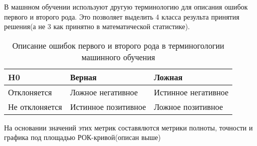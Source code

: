 В машнном обучении используют другую терминологию для описания ошибок первого и второго рода. Это позволяет выделить 4 класса результа принятия решения(а не 3 как принятно в математической статистике).
\begin{table}[!h]
	
	\caption{\label{tab:truefalse2}Описание ошибок первого и второго рода в терминогологии машинного обучения}
	
	\begin{center}
		
		\begin{tabular}{|l|l|l|}
			
			\hline
			
			H0 & Верная & Ложная \\
			
			\hline \hline
			
			Отклоняется & Ложное негативное & Истинное негативное \\
			
			\hline 
			Не отклоняется & Истинное позитивное  & Ложное позитивное\\
			\hline 
			
		\end{tabular}
		
	\end{center}
	
\end{table}
На основании значений этих метрик составялются метрики полноты, точности и графика под площадью РОК-кривой(описан выше)
